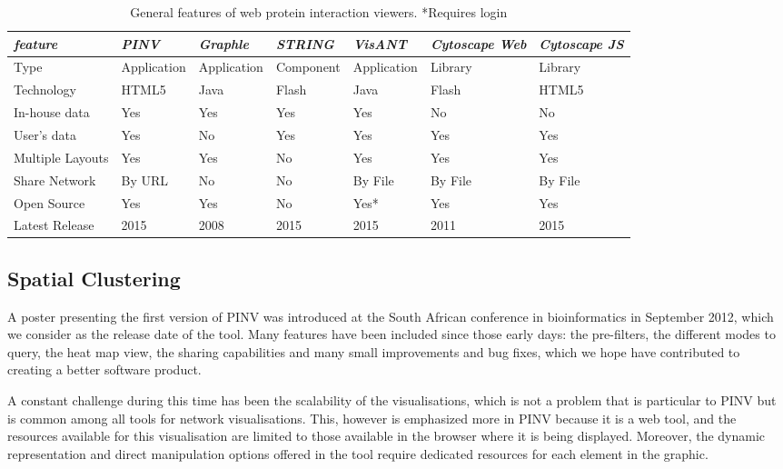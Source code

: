 \begin{table}[!ht]
\centering
        \begin{tabular}{| l | l | l | l | l | l | l |}
\hline \rowcolor{table_header}
\emph{feature} & \emph{PINV} & \emph{Graphle} & \emph{STRING} & \emph{VisANT} & \emph{Cytoscape Web} & \emph{Cytoscape JS}\\
\hline \rowcolor{row_odd}
Type & Application & Application & Component & Application & Library & Library\\
\hline \rowcolor{row_even}
Technology & HTML5 & Java & Flash & Java & Flash & HTML5\\
\hline \rowcolor{row_odd}
In-house data & Yes & Yes & Yes & Yes & No & No\\
\hline \rowcolor{row_even}
User's data & Yes & No & Yes & Yes & Yes & Yes\\
\hline \rowcolor{row_odd}
Multiple Layouts & Yes & Yes & No & Yes & Yes & Yes\\
\hline \rowcolor{row_even}
Share Network & By URL & No & No & By File & By File & By File\\
\hline \rowcolor{row_odd}
Open Source & Yes & Yes & No & Yes* & Yes & Yes\\
\hline \rowcolor{row_even}
Latest Release & 2015 & 2008 & 2015 & 2015 & 2011 & 2015\\
\hline 
        \end{tabular}
        \caption{General features of web protein interaction viewers. *Requires login}
        \label{tab:int_viewers}
\end{table}


\subsection{Spatial Clustering} \label{section:clustering}
A poster presenting the first version of PINV was introduced at the South African conference in bioinformatics in September 2012, which we consider as the release date of the tool. Many features have been included since those early days: the pre-filters, the different modes to query, the heat map view, the sharing capabilities and many small improvements and bug fixes, which we hope have contributed to creating a better software product.

A constant challenge during this time has been the scalability of the visualisations, which is not a problem that is particular to PINV but is common among all tools for network visualisations. This, however is emphasized more in PINV because it is a web tool, and the resources available for this visualisation are limited to those available in the browser where it is being displayed. Moreover, the dynamic representation and direct manipulation options offered in the tool require dedicated resources for each element in the graphic.

